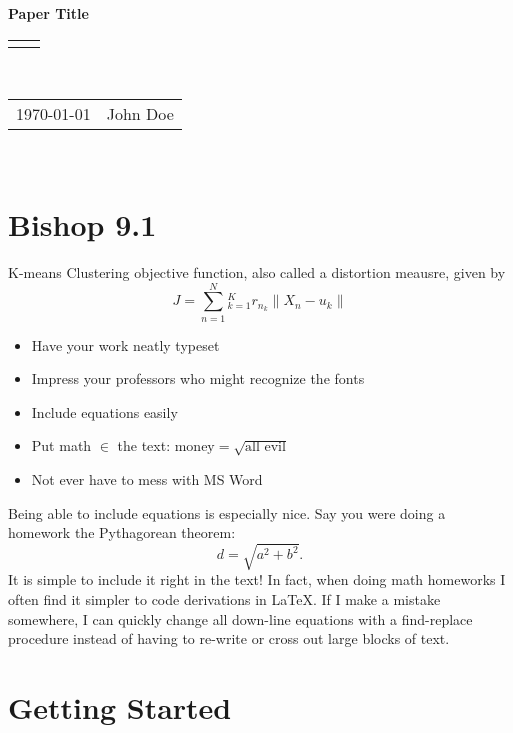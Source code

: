 \documentclass[12pt]{article}
\renewcommand{\title}[1]{\textbf{#1}\\}
\renewcommand{\line}{\begin{tabularx}{\textwidth}{X>{\raggedleft}X}\hline\\\end{tabularx}\\[-0.5cm]}
\newcommand{\leftright}[2]{\begin{tabularx}{\textwidth}{X>{\raggedleft}X}#1%
& #2\\\end{tabularx}\\[-0.5cm]}
\begin{document}
\title{Paper Title}
\line
\leftright{\today}{John Doe} %

\section{Bishop 9.1}
K-means Clustering objective function, also called a distortion meausre, given by
\begin{equation}
J=\sum_{n=1}^{N}_{k=1}^{K}r_n_k\lVert X_n - u_k\rVert
\end{equation}

\begin{itemize}
\item Have your work neatly typeset
\item Impress your professors who might recognize the fonts
\item Include equations easily
\item Put math $\in$ the text: $\textrm{money} = \sqrt{\textrm{all evil}}$
\item Not ever have to mess with MS Word
\end{itemize}



Being able to include equations is especially nice.  Say you were doing a
homework the Pythagorean theorem:
\begin{equation}
d = \sqrt{a^2+b^2}.
\end{equation}
It is simple to include it right in the text!  In fact, when doing math
homeworks I often find it simpler to code derivations in \LaTeX.  If I make a
mistake somewhere, I can quickly change all down-line equations with a
find-replace procedure instead of having to re-write or cross out large blocks
of text.
\section{Getting Started}
\end{document}
